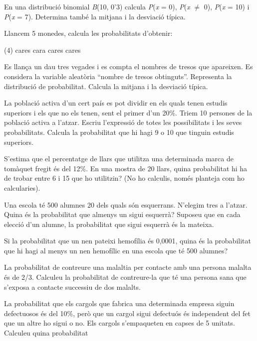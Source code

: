 \begin{mylist}
	\item
	En una distribució binomial \emph{B}(10, 0'3) calcula
	\emph{P}(\emph{x} = 0), \emph{P}(\emph{x} $\neq$ 0), \emph{P}(\emph{x} = 10) i \emph{P}(\emph{x} = 7). Determina també la mitjana i la desviació típica.
	\item
	Llancem 5 monedes, calcula les probabilitats d'obtenir:
	\begin{tasks}(4)
		 cares
		 cara
		 cares
		 cares
	\end{tasks}
 
	\item
	Es llança un dau tres vegades i es compta el nombres de tresos que
	apareixen. Es considera la variable aleatòria ``nombre de tresos
	obtinguts''. Representa la distribució de probabilitat. Calcula la
	mitjana i la desviació típica.
	\item
	La població activa d'un cert país es pot dividir en els quals tenen
	estudis superiors i els que no els tenen, sent el primer d'un 20\%.
	Triem 10 persones de la població activa a l'atzar. Escriu l'expressió
	de totes les possibilitats i les seves probabilitats. Calcula la
	probabilitat que hi hagi 9 o 10 que tinguin estudis superiors.
	\item
	S'estima que el percentatge de llars que utilitza una determinada
	marca de tomàquet fregit és del 12\%. En una mostra de 20 llars, quina
	probabilitat hi ha de trobar entre 6 i 15 que ho utilitzin? (No ho
	calculis, només planteja com ho calcularies).
	\item
	Una escola té 500 alumnes 20 dels quals són esquerrans. N'elegim tres
	a l'atzar. Quina és la probabilitat que almenys un sigui esquerrà?
	Suposeu que en cada elecció d'un alumne, la probabilitat que sigui
	esquerrà és la mateixa. 
	\item
	Si la probabilitat que un nen pateixi hemofília és 0,0001, quina és la
	probabilitat que hi hagi al menys un nen hemofílic en una escola que
	té 500 alumnes? 
	\item
	La probabilitat de contreure una malaltia per contacte amb una persona
	malalta és de 2/3. Calculeu la probabilitat de contreure-la que té una
	persona sana que s'exposa a contacte successiu de dos malalts. 
	\item
	La probabilitat que els cargols que fabrica una determinada empresa
	siguin defectuosos és del 10\%, però que un cargol sigui defectuós és
	independent del fet que un altre ho sigui o no. Els cargols
	s'empaqueten en capses de 5 unitats. Calculeu quina probabilitat

\end{mylist}

